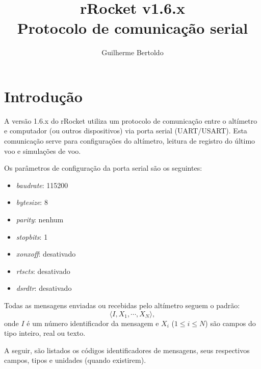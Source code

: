 \documentclass[portuguese,10pt,a4paper]{article}
\title{rRocket v1.6.x \\Protocolo de comunicação serial}
\author{Guilherme Bertoldo}
\begin{document}
	\maketitle
\section{Introdução}
A versão 1.6.x do rRocket utiliza um protocolo de comunicação entre o  altímetro e computador (ou outros dispositivos) via porta serial (UART/USART). Esta comunicação serve para configurações do altímetro, leitura de registro do último voo e simulações de voo.  

Os parâmetros de configuração da porta serial são os seguintes:
\begin{itemize}
	\item \textit{baudrate}: 115200
	\item \textit{bytesize}: 8
	\item \textit{parity}: nenhum
	\item \textit{stopbits}: 1
	\item \textit{xonxoff}: desativado
	\item \textit{rtscts}: desativado
	\item \textit{dsrdtr}: desativado
\end{itemize}

Todas as mensagens enviadas ou recebidas pelo altímetro seguem o padrão:
\begin{equation}
	\langle I, X_1, \cdots, X_N \rangle,
	\nonumber
\end{equation}
onde $I$ é um número identificador da mensagem e $X_i$ ($1\le i \le N$) são campos do tipo inteiro, real ou texto.

A seguir, são listados os códigos identificadores de mensagens, seus respectivos campos, tipos e unidades (quando existirem).
\end{document}
